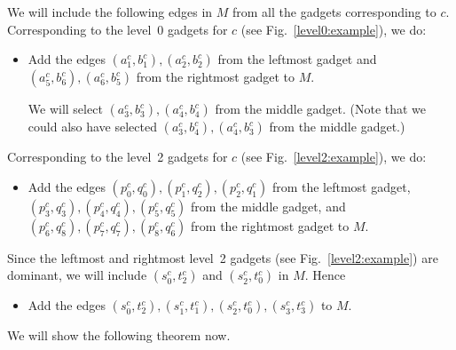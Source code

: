 \documentclass{llncs}
\begin{document}
We will include the following edges in $M$ from all the gadgets corresponding to $c$.
Corresponding to the level~0 gadgets for $c$ (see Fig.~\ref{level0:example}), we do:
  \begin{itemize}
  \item  Add the edges  $(a^c_1,b^c_1), (a^c_2,b^c_2)$ from the leftmost gadget and $(a^c_5,b^c_6),(a^c_6,b^c_5)$
    from the rightmost gadget to $M$.

    We will select $(a^c_3,b^c_3),(a^c_4,b^c_4)$ from the middle gadget. (Note that we  could also have selected
    $(a^c_3,b^c_4),(a^c_4,b^c_3)$ from the middle gadget.) 
  \end{itemize}

  
Corresponding to the level~2 gadgets for $c$  (see Fig.~\ref{level2:example}), we do:
  \begin{itemize}
  \item Add the edges $(p^c_0,q^c_0),(p^c_1,q^c_2),(p^c_2,q^c_1)$ from the leftmost gadget,
    $(p^c_3,q^c_3),(p^c_4,q^c_4),(p^c_5,q^c_5)$ from the middle gadget, and
    $(p^c_6,q^c_8),(p^c_7,q^c_7),(p^c_8,q^c_6)$ from the rightmost gadget to $M$.
  \end{itemize}

 Since the leftmost and rightmost level~2 gadgets (see Fig.~\ref{level2:example}) are dominant, we will include $(s^c_0,t^c_2)$ and $(s^c_2,t^c_0)$ in $M$. Hence
  \begin{itemize}
     \item Add the edges $(s^c_0,t^c_2), (s^c_1,t^c_1),(s^c_2,t^c_0),(s^c_3,t^c_3)$ to $M$.
  \end{itemize}

We will show the following theorem now.
\end{document}
